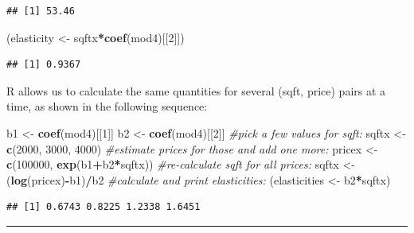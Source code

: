 \documentclass[
]{book}
\newenvironment{Shaded}{\begin{snugshade}}{\end{snugshade}}
\newcommand{\CommentTok}[1]{\textcolor[rgb]{0.56,0.35,0.01}{\textit{#1}}}
\newcommand{\DecValTok}[1]{\textcolor[rgb]{0.00,0.00,0.81}{#1}}
\newcommand{\FunctionTok}[1]{\textcolor[rgb]{0.13,0.29,0.53}{\textbf{#1}}}
\newcommand{\NormalTok}[1]{#1}
\newcommand{\OtherTok}[1]{\textcolor[rgb]{0.56,0.35,0.01}{#1}}
\newcommand{\SpecialCharTok}[1]{\textcolor[rgb]{0.81,0.36,0.00}{\textbf{#1}}}
\begin{document}
\begin{verbatim}
## [1] 53.46
\end{verbatim}

\begin{Shaded}
\begin{Highlighting}[]
\NormalTok{(elasticity }\OtherTok{\textless{}{-}}\NormalTok{ sqftx}\SpecialCharTok{*}\FunctionTok{coef}\NormalTok{(mod4)[[}\DecValTok{2}\NormalTok{]])}
\end{Highlighting}
\end{Shaded}

\begin{verbatim}
## [1] 0.9367
\end{verbatim}

R allows us to calculate the same quantities for several (sqft, price) pairs at a time, as shown in the following sequence:

\begin{Shaded}
\begin{Highlighting}[]
\NormalTok{b1 }\OtherTok{\textless{}{-}} \FunctionTok{coef}\NormalTok{(mod4)[[}\DecValTok{1}\NormalTok{]]}
\NormalTok{b2 }\OtherTok{\textless{}{-}} \FunctionTok{coef}\NormalTok{(mod4)[[}\DecValTok{2}\NormalTok{]]}
\CommentTok{\#pick a few values for sqft:}
\NormalTok{sqftx }\OtherTok{\textless{}{-}} \FunctionTok{c}\NormalTok{(}\DecValTok{2000}\NormalTok{, }\DecValTok{3000}\NormalTok{, }\DecValTok{4000}\NormalTok{) }
\CommentTok{\#estimate prices for those and add one more:}
\NormalTok{pricex }\OtherTok{\textless{}{-}} \FunctionTok{c}\NormalTok{(}\DecValTok{100000}\NormalTok{, }\FunctionTok{exp}\NormalTok{(b1}\SpecialCharTok{+}\NormalTok{b2}\SpecialCharTok{*}\NormalTok{sqftx)) }
\CommentTok{\#re{-}calculate sqft for all prices:}
\NormalTok{sqftx }\OtherTok{\textless{}{-}}\NormalTok{ (}\FunctionTok{log}\NormalTok{(pricex)}\SpecialCharTok{{-}}\NormalTok{b1)}\SpecialCharTok{/}\NormalTok{b2 }
\CommentTok{\#calculate and print elasticities:}
\NormalTok{(elasticities }\OtherTok{\textless{}{-}}\NormalTok{ b2}\SpecialCharTok{*}\NormalTok{sqftx) }
\end{Highlighting}
\end{Shaded}

\begin{verbatim}
## [1] 0.6743 0.8225 1.2338 1.6451
\end{verbatim}

\begin{center}\rule{0.5\linewidth}{0.5pt}\end{center}
\end{document}
